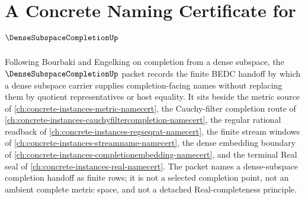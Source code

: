 \chapter{A Concrete Naming Certificate for $\DenseSubspaceCompletionUp$}
\label{ch:concrete-instances-dense-subspace-completion-namecert}

Following Bourbaki and Engelking on completion from a dense subspace, the $\DenseSubspaceCompletionUp$ packet records the finite BEDC handoff by which a dense subspace carrier supplies completion-facing names without replacing them by quotient representatives or host equality. It sits beside the metric source of \autoref{ch:concrete-instances-metric-namecert}, the Cauchy-filter completion route of \autoref{ch:concrete-instances-cauchyfiltercompletion-namecert}, the regular rational readback of \autoref{ch:concrete-instances-regseqrat-namecert}, the finite stream windows of \autoref{ch:concrete-instances-streamname-namecert}, the dense embedding boundary of \autoref{ch:concrete-instances-completionembedding-namecert}, and the terminal Real seal of \autoref{ch:concrete-instances-real-namecert}. The packet names a dense-subspace completion handoff as finite rows; it is not a selected completion point, not an ambient complete metric space, and not a detached Real-completeness principle.


